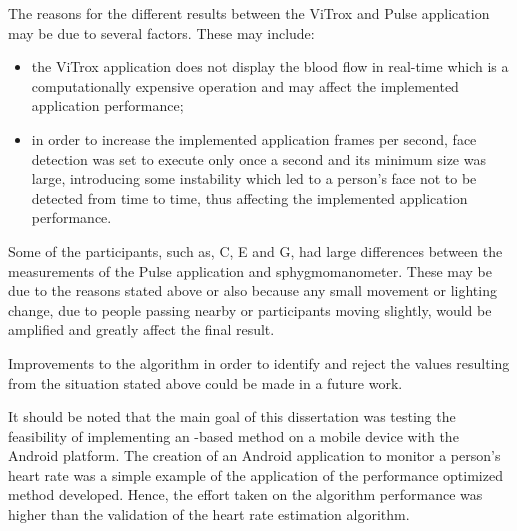The reasons for the different results between the ViTrox and Pulse application
may be due to several factors. These may include:

\begin{itemize}
  \item the ViTrox application does not display the blood flow in real-time
        which is a computationally expensive operation and may affect the
        implemented application performance;
  \item in order to increase the implemented application frames per second,
        face detection was set to execute only once a second and its minimum
        size was large, introducing some instability which led to a person's
        face not to be detected from time to time, thus affecting the
        implemented application performance.
\end{itemize}

Some of the participants, such as, C, E and G, had large differences between
the measurements of the Pulse application and sphygmomanometer. These may be
due to the reasons stated above or also because any small movement or lighting
change, due to people passing nearby or participants moving slightly,
would be amplified and greatly affect the final result.

Improvements to the algorithm in order to identify and reject the values
resulting from the situation stated above could be made in a future work.

It should be noted that the main goal of this dissertation was testing the
feasibility of implementing an \evm{}-based method on a mobile device with
the Android platform. The creation of an Android application to monitor
a person's heart rate was a simple example of the application of the
performance optimized \evm{} method developed.
Hence, the effort taken on the algorithm performance was higher than
the validation of the heart rate estimation algorithm.


